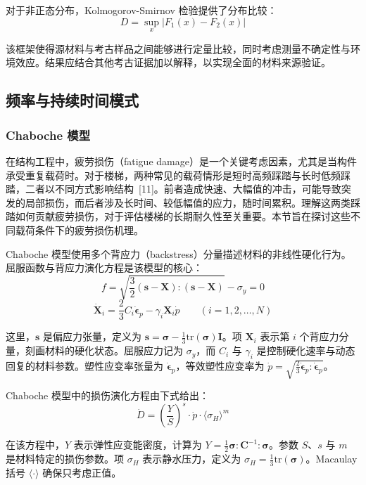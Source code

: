 \documentclass[11pt,a4paper]{ctexart}
\begin{document}
对于非正态分布，Kolmogorov-Smirnov 检验提供了分布比较：
\begin{equation}
D = \sup_{x}|F_1(x)-F_2(x)|
\end{equation}

该框架使得源材料与考古样品之间能够进行定量比较，同时考虑测量不确定性与环境效应。结果应结合其他考古证据加以解释，以实现全面的材料来源验证。

\subsection{频率与持续时间模式}

\subsubsection{Chaboche 模型}

在结构工程中，疲劳损伤（fatigue damage）是一个关键考虑因素，尤其是当构件承受重复载荷时。对于楼梯，两种常见的载荷情形是短时高频踩踏与长时低频踩踏，二者以不同方式影响结构~[11]。前者造成快速、大幅值的冲击，可能导致突发的局部损伤，而后者涉及长时间、较低幅值的应力，随时间累积。理解这两类踩踏如何贡献疲劳损伤，对于评估楼梯的长期耐久性至关重要。本节旨在探讨这些不同载荷条件下的疲劳损伤机理。

Chaboche 模型使用多个背应力（backstress）分量描述材料的非线性硬化行为。屈服函数与背应力演化方程是该模型的核心：
\begin{equation}
f = \sqrt{\frac{3}{2}(\mathbf{s}-\mathbf{X}):(\mathbf{s}-\mathbf{X})} - \sigma_y = 0
\end{equation}
\begin{equation}
\dot{\mathbf{X}}_i = \frac{2}{3}C_i\dot{\bm{\epsilon}}_p - \gamma_i\mathbf{X}_i\dot{p} \qquad (i = 1,2,\dots,N)
\end{equation}

这里，$\mathbf{s}$ 是偏应力张量，定义为 $\mathbf{s} = \bm{\sigma} - \frac{1}{3}\mathrm{tr}(\bm{\sigma})\mathbf{I}$。项 $\mathbf{X}_i$ 表示第 $i$ 个背应力分量，刻画材料的硬化状态。屈服应力记为 $\sigma_y$，而 $C_i$ 与 $\gamma_i$ 是控制硬化速率与动态回复的材料参数。塑性应变率张量为 $\dot{\bm{\epsilon}}_p$，等效塑性应变率为 $\dot{p} = \sqrt{\frac{2}{3}\dot{\bm{\epsilon}}_p:\dot{\bm{\epsilon}}_p}$。

Chaboche 模型中的损伤演化方程由下式给出：
\begin{equation}
\dot{D} = \left(\frac{Y}{S}\right)^{s}\cdot\dot{p}\cdot\langle\sigma_H\rangle^{m}
\end{equation}

在该方程中，$Y$ 表示弹性应变能密度，计算为 $Y = \frac{1}{2}\bm{\sigma}:\mathbf{C}^{-1}:\bm{\sigma}$。参数 $S$、$s$ 与 $m$ 是材料特定的损伤参数。项 $\sigma_H$ 表示静水压力，定义为 $\sigma_H = \frac{1}{3}\mathrm{tr}(\bm{\sigma})$。Macaulay 括号 $\langle\cdot\rangle$ 确保只考虑正值。
\end{document}
